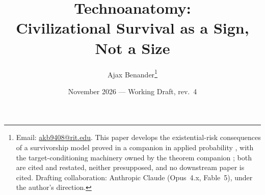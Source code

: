 \usepackage[style=numeric, sorting=none]{biblatex}



\renewcommand*{\bibfont}{\small}
\newcommand{\E}{\mathbb{E}}
\newcommand{\PP}{\mathbb{P}}
\newcommand{\R}{\mathbb{R}}
\DeclareMathOperator{\Var}{Var}
\DeclareMathOperator{\Cov}{Cov}
\DeclareMathOperator{\Leb}{Leb}
\newcommand{\eqd}{\overset{d}{=}}
\newcommand{\one}{\mathbf{1}}
\newcommand{\Imm}{\mathcal{I}}
\newcommand{\Fc}{\mathcal{F}}
\newcommand{\Lc}{\mathcal{L}}
\newcommand{\hm}{\mathfrak{h}}
\newcommand{\Ac}{\mathcal{A}}
\newcommand{\Sc}{\mathsf{S}}
\theoremstyle{plain}
\newtheorem{theorem}{Theorem}[section]
\newtheorem{proposition}[theorem]{Proposition}
\newtheorem{lemma}[theorem]{Lemma}
\newtheorem{corollary}[theorem]{Corollary}
\newtheorem{claim}[theorem]{Claim}
\theoremstyle{definition}
\newtheorem{definition}[theorem]{Definition}
\newtheorem{ansatz}[theorem]{Ansatz}
\newtheorem{convention}[theorem]{Convention}
\newtheorem{constraint}{Constraint}
\newtheorem{principle}{Principle}
\newtheorem{example}[theorem]{Example}
\newtheorem{premise}{Premise}
\newtheorem{objection}[theorem]{Objection}
\renewcommand{\thepremise}{$\Phi$\arabic{premise}}
\theoremstyle{remark}
\newtheorem{remark}[theorem]{Remark}
\title{Technoanatomy:\\ \large Civilizational Survival as a Sign, Not a Size}
\author{Ajax Benander\thanks{Email:
\href{mailto:akb9408@rit.edu}{akb9408@rit.edu}. This paper develops the
existential-risk consequences of a survivorship model proved in a companion in
applied probability \cite{GoldenSurvivorship}, with the target-conditioning
machinery owned by the theorem companion \cite{GoldenTargeted}; both are
cited and restated, neither presupposed, and no downstream paper is
cited. Drafting
collaboration: Anthropic Claude (Opus~4.x, Fable~5), under the author's
direction.}}
\date{November 2026 --- Working Draft, rev.~4}

\maketitle

